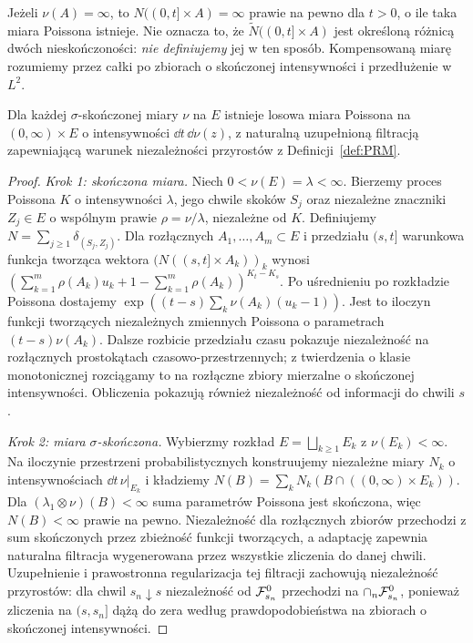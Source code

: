\begin{uwaga}
Jeżeli $\nu(A)=\infty$, to $N((0,t]\times A)=\infty$
prawie na pewno dla $t>0$, o ile taka miara Poissona istnieje.
Nie oznacza to, że $\widetilde N((0,t]\times A)$ jest określoną
różnicą dwóch nieskończoności: \emph{nie definiujemy} jej w ten
sposób. Kompensowaną miarę rozumiemy przez całki po zbiorach o
skończonej intensywności i przedłużenie w $L^2$.
\end{uwaga}

\begin{twierdzenie}
\label{th:prm-existence}
Dla każdej $\sigma$-skończonej miary $\nu$ na $E$ istnieje
losowa miara Poissona na $(0,\infty)\times E$ o intensywności
$\dd t\,\dd\nu(z)$, z naturalną uzupełnioną filtracją
zapewniającą warunek niezależności przyrostów z
Definicji~\ref{def:PRM}.
\end{twierdzenie}
\begin{proof}
\emph{Krok 1: skończona miara.} Niech $0<\nu(E)=\lambda<\infty$.
Bierzemy proces Poissona $K$ o intensywności $\lambda$, jego
chwile skoków $S_j$ oraz niezależne znaczniki $Z_j\in E$ o
wspólnym prawie $\rho=\nu/\lambda$, niezależne od $K$.
Definiujemy $N=\sum_{j\ge1}\delta_{(S_j,Z_j)}$.
Dla rozłącznych $A_1,\ldots,A_m\subset E$ i przedziału
$(s,t]$ warunkowa funkcja tworząca wektora
$(N((s,t]\times A_k))_k$ wynosi
$(\sum_{k=1}^m\rho(A_k)u_k+1-\sum_{k=1}^m\rho(A_k))^{K_t-K_s}$.
Po uśrednieniu po rozkładzie Poissona dostajemy
$\exp((t-s)\sum_k\nu(A_k)(u_k-1))$.
Jest to iloczyn funkcji tworzących niezależnych zmiennych
Poissona o parametrach $(t-s)\nu(A_k)$.
Dalsze rozbicie przedziału czasu pokazuje niezależność na
rozłącznych prostokątach czasowo-przestrzennych; z twierdzenia
o klasie monotonicznej rozciągamy to na rozłączne zbiory
mierzalne o skończonej intensywności. Obliczenia pokazują
również niezależność od informacji do chwili $s$.

\emph{Krok 2: miara $\sigma$-skończona.} Wybierzmy rozkład
$E=\bigsqcup_{k\ge1}E_k$ z $\nu(E_k)<\infty$.
Na iloczynie przestrzeni probabilistycznych konstruujemy niezależne
miary $N_k$ o intensywnościach $\dd t\,\nu|_{E_k}$ i kładziemy
$N(B)=\sum_kN_k(B\cap((0,\infty)\times E_k))$.
Dla $(\lambda_1\otimes\nu)(B)<\infty$ suma parametrów Poissona
jest skończona, więc $N(B)<\infty$ prawie na pewno.
Niezależność dla rozłącznych zbiorów przechodzi z sum skończonych
przez zbieżność funkcji tworzących, a adaptację zapewnia naturalna
filtracja wygenerowana przez wszystkie zliczenia do danej chwili.
Uzupełnienie i prawostronna regularizacja tej filtracji zachowują
niezależność przyrostów: dla chwil $s_n\downarrow s$ niezależność
od $\mathcal{F}^0_{s_n}$ przechodzi na $\cap_n\mathcal{F}^0_{s_n}$, ponieważ
zliczenia na $(s,s_n]$ dążą do zera według prawdopodobieństwa
na zbiorach o skończonej intensywności.
\end{proof}

